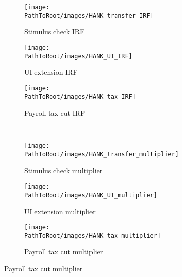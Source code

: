\documentclass[\PathToRoot/\ProjectName]{subfiles}
\begin{document}
\begin{figure}[H]
  \centering
  \caption{General equilibrium policy comparison in HANK-SAM model}
  \whenintegrated{\label{fig:HANK_IRFs}} 
  \noindent\begin{minipage}{\textwidth}
    \centering
    \begin{subfigure}[b]{.30\linewidth}
      \centering
      \texttt{[image: \\PathToRoot/images/HANK\_transfer\_IRF]}
      \caption{Stimulus check IRF}
      \whenintegrated{\label{fig:hank_stimulus_irf}} 
    \end{subfigure}
    \begin{subfigure}[b]{.30\linewidth}
      \centering
      \texttt{[image: \\PathToRoot/images/HANK\_UI\_IRF]}
      \caption{UI extension IRF}
      \whenintegrated{\label{fig:hank_UI_irf}} 
    \end{subfigure}
    \begin{subfigure}[b]{.30\linewidth}
      \centering
      \texttt{[image: \\PathToRoot/images/HANK\_tax\_IRF]}
      \caption{Payroll tax cut IRF}
      \whenintegrated{\label{fig:hank_tax_irf}} 
    \end{subfigure}
    \\[1em]
    \begin{subfigure}[b]{.30\linewidth}
      \centering
      \texttt{[image: \\PathToRoot/images/HANK\_transfer\_multiplier]}
      \caption{Stimulus check multiplier}
      \whenintegrated{\label{fig:HANK_transfer_multiplier}} 
    \end{subfigure}
    \begin{subfigure}[b]{.30\linewidth}
      \centering
      \texttt{[image: \\PathToRoot/images/HANK\_UI\_multiplier]}
      \caption{UI extension multiplier}
      \whenintegrated{\label{fig:HANK_UI_multiplier}} 
    \end{subfigure}
    \begin{subfigure}[b]{.30\linewidth}
      \centering
      \texttt{[image: \\PathToRoot/images/HANK\_tax\_multiplier]}
      \caption{Payroll tax cut multiplier}
      \whenintegrated{\label{fig:HANK_tax_multiplier}} 
    \end{subfigure}
  \end{minipage}
\end{figure}
\end{document}
